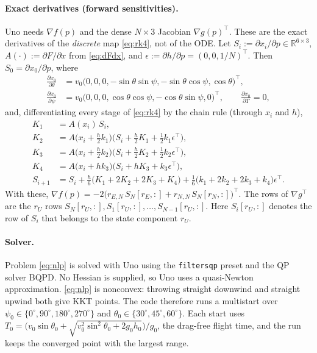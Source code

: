 \documentclass[11pt]{article}
\newcommand{\R}{\mathbb{R}}
\begin{document}
\paragraph{Exact derivatives (forward sensitivities).} Uno needs $\nabla f(p)$ and the dense
$N\times 3$ Jacobian $\nabla g(p)^\top$. These are the exact derivatives of the \emph{discrete}
map \eqref{eq:rk4}, not of the ODE. Let $S_i := \partial x_i/\partial p \in \R^{6\times 3}$,
$A(\cdot) := \partial F/\partial x$ from \eqref{eq:dFdx}, and
$\epsilon := \partial h/\partial p = (0,0,1/N)^\top$. Then
$S_0 = \partial x_0/\partial p$, where
\begin{align*}
  \frac{\partial x_0}{\partial\theta} &= v_0\bigl(0,0,0,-\sin\theta\sin\psi,-\sin\theta\cos\psi,\cos\theta\bigr)^\top,\\
  \frac{\partial x_0}{\partial\psi} &= v_0\bigl(0,0,0,\cos\theta\cos\psi,-\cos\theta\sin\psi,0\bigr)^\top,\qquad
  \frac{\partial x_0}{\partial T} = 0,
\end{align*}
and, differentiating every stage of \eqref{eq:rk4} by the chain rule (through $x_i$ and $h$),
\begin{equation}
\begin{aligned}
  K_1 &= A(x_i)\,S_i, \\
  K_2 &= A\bigl(x_i+\tfrac h2 k_1\bigr)\bigl(S_i + \tfrac h2 K_1 + \tfrac12 k_1\epsilon^\top\bigr),\\
  K_3 &= A\bigl(x_i+\tfrac h2 k_2\bigr)\bigl(S_i + \tfrac h2 K_2 + \tfrac12 k_2\epsilon^\top\bigr),\\
  K_4 &= A\bigl(x_i+h k_3\bigr)\bigl(S_i + h K_3 + k_3\epsilon^\top\bigr),\\
  S_{i+1} &= S_i + \tfrac h6\bigl(K_1+2K_2+2K_3+K_4\bigr) + \tfrac16\bigl(k_1+2k_2+2k_3+k_4\bigr)\epsilon^\top .
\end{aligned}
\tag{sens}\label{eq:sens}
\end{equation}
With these, $\nabla f(p) = -2\bigl(r_{E,N}\,S_N[r_E,:] + r_{N,N}\,S_N[r_N,:]\bigr)^\top$. The rows of
$\nabla g^\top$ are the $r_U$ rows $S_N[r_U,:], S_1[r_U,:],\dots,S_{N-1}[r_U,:]$. Here $S_i[r_U,:]$
denotes the row of $S_i$ that belongs to the state component $r_U$.

\paragraph{Solver.} Problem \eqref{eq:nlp} is solved with Uno using the \texttt{filtersqp} preset and
the QP solver BQPD. No Hessian is supplied, so Uno uses a quasi-Newton approximation.
\eqref{eq:nlp} is nonconvex: throwing straight downwind and straight upwind both give KKT points.
The code therefore runs a multistart over $\psi_0\in\{0^\circ,90^\circ,180^\circ,270^\circ\}$ and
$\theta_0\in\{30^\circ,45^\circ,60^\circ\}$. Each start uses
$T_0 = \bigl(v_0\sin\theta_0 + \sqrt{v_0^2\sin^2\theta_0 + 2g_0h_0}\bigr)/g_0$, the drag-free flight time,
and the run keeps the converged point with the largest range.
\end{document}
